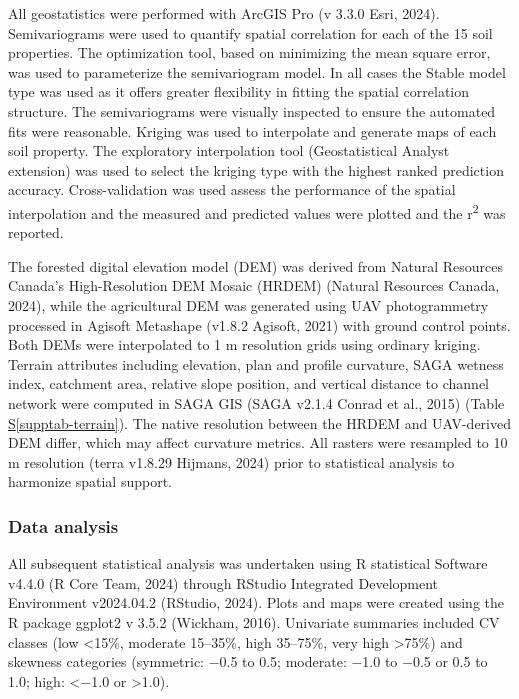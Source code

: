 \documentclass[
  number]{elsarticle}
\newcommand*\quartosupptabref[1]{Table \hyperref[#1]{S\ref{#1}}}
\begin{document}
All geostatistics were performed with ArcGIS Pro (v 3.3.0 Esri, 2024).
Semivariograms were used to quantify spatial correlation for each of the
15 soil properties. The optimization tool, based on minimizing the mean
square error, was used to parameterize the semivariogram model. In all
cases the Stable model type was used as it offers greater flexibility in
fitting the spatial correlation structure. The semivariograms were
visually inspected to ensure the automated fits were reasonable. Kriging
was used to interpolate and generate maps of each soil property. The
exploratory interpolation tool (Geostatistical Analyst extension) was
used to select the kriging type with the highest ranked prediction
accuracy. Cross-validation was used assess the performance of the
spatial interpolation and the measured and predicted values were plotted
and the r\textsuperscript{2} was reported.

The forested digital elevation model (DEM) was derived from Natural
Resources Canada's High-Resolution DEM Mosaic (HRDEM) (Natural Resources
Canada, 2024), while the agricultural DEM was generated using UAV
photogrammetry processed in Agisoft Metashape (v1.8.2 Agisoft, 2021)
with ground control points. Both DEMs were interpolated to 1 m
resolution grids using ordinary kriging. Terrain attributes including
elevation, plan and profile curvature, SAGA wetness index, catchment
area, relative slope position, and vertical distance to channel network
were computed in SAGA GIS (SAGA v2.1.4 Conrad et al., 2015)
(\quartosupptabref{supptab-terrain}). The native resolution between the
HRDEM and UAV-derived DEM differ, which may affect curvature metrics.
All rasters were resampled to 10 m resolution (terra v1.8.29 Hijmans,
2024) prior to statistical analysis to harmonize spatial support.

\subsubsection{Data analysis}\label{data-analysis}

All subsequent statistical analysis was undertaken using R statistical
Software v4.4.0 (R Core Team, 2024) through RStudio Integrated
Development Environment v2024.04.2 (RStudio, 2024). Plots and maps were
created using the R package ggplot2 v 3.5.2 (Wickham, 2016). Univariate
summaries included CV classes (low \textless15\%, moderate 15--35\%,
high 35--75\%, very high \textgreater75\%) and skewness categories
(symmetric: −0.5 to 0.5; moderate: −1.0 to −0.5 or 0.5 to 1.0; high:
\textless−1.0 or \textgreater1.0).
\end{document}
